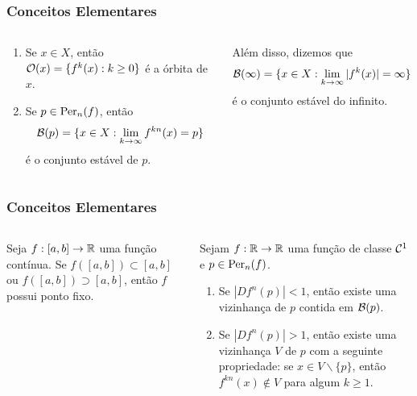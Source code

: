 \begin{frame} 
\vspace{5pt}
\frametitle{Conceitos Elementares}
\begin{columns}
\column{\dimexpr\paperwidth-15pt}

\begin{definition}
\begin{enumerate}
\item Se $x \in X$, então $\mathcal{O}(x) = \lbrace f^k(x) : k \geq 0 \rbrace$ é a órbita de $x$.

\item Se $p \in \operatorname{Per}_n(f)$, então $$\mathcal{B}(p) = \lbrace x \in  X: \lim_{k \to \infty} f^{kn}(x) = p \rbrace$$ é o conjunto estável de $p$.
\end{enumerate}
\end{definition}

\pause

Além disso, dizemos que $$\mathcal{B}(\infty) = \lbrace x \in  X: \lim_{k \to \infty} |f^k(x)| = \infty \rbrace$$ é o conjunto estável do infinito.

\end{columns}
\end{frame}


\begin{frame}
\vspace{5pt}
\frametitle{Conceitos Elementares}
\begin{columns}
\column{\dimexpr\paperwidth-15pt}

\begin{proposition}
Seja $f: [a, b] \to \mathbb{R}$ uma função contínua. Se $f([a, b]) \subset [a, b]$ ou $f([a, b]) \supset [a, b]$, então $f$ possui ponto fixo.
\end{proposition}

\begin{theorem}
Sejam $f: \mathbb{R} \to \mathbb{R}$ uma função de classe $\mathcal{C}^1$ e $p \in \operatorname{Per}_n(f)$.
\begin{enumerate}
\item Se $|D f^n(p)| < 1$, então existe uma vizinhança de $p$ contida em $\mathcal{B}(p)$.
\item Se $|D f^n(p)| > 1$, então existe uma vizinhança $V$ de $p$ com a seguinte propriedade: se $x \in V \backslash \lbrace p \rbrace$, então  $f^{kn}(x) \notin V$ para algum $k \geq 1$. 
\end{enumerate}
\end{theorem}

\end{columns}
\end{frame}

